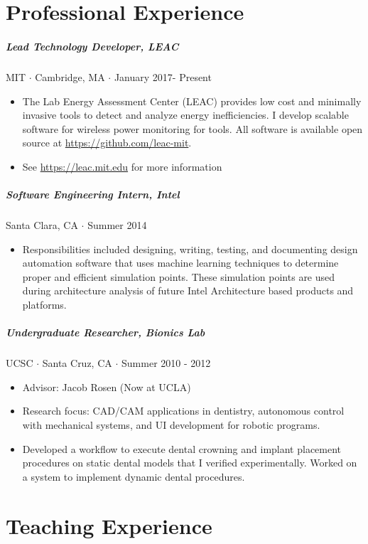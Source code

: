 \documentclass[10pt,letterpaper]{article}
\begin{document}
\section*{Professional Experience}
\subparagraph{Lead Technology Developer, LEAC} MIT $\cdot$ Cambridge, MA $\cdot$ January 2017- Present
\begin{itemize}
    \item The Lab Energy Assessment Center (LEAC) provides low cost and minimally invasive tools to detect and analyze energy inefficiencies. I develop scalable software for wireless power monitoring for tools. All software is available open source at \url{https://github.com/leac-mit}.
\item See \url{https://leac.mit.edu} for more information
\end{itemize}

\subparagraph{Software Engineering Intern, Intel}
Santa Clara, CA $\cdot$ Summer 2014
\begin{itemize}
\item Responsibilities included designing, writing, testing, and documenting design automation software that uses machine learning techniques to determine proper and efficient simulation points. These simulation points are used during architecture analysis of future Intel Architecture based products and platforms.
\end{itemize}

\subparagraph{Undergraduate Researcher, Bionics Lab}
UCSC $\cdot$ Santa Cruz, CA $\cdot$ Summer 2010 - 2012
\begin{itemize}
    \item Advisor: Jacob Rosen (Now at UCLA)
     	\item Research focus: CAD/CAM applications in dentistry, autonomous control with mechanical systems, and UI development for robotic programs.
     	\item  Developed a workflow to execute dental crowning and implant placement procedures on static dental models that I verified experimentally. Worked on a system to implement dynamic dental procedures. 
\end{itemize}


\section*{Teaching Experience}
\end{document}
